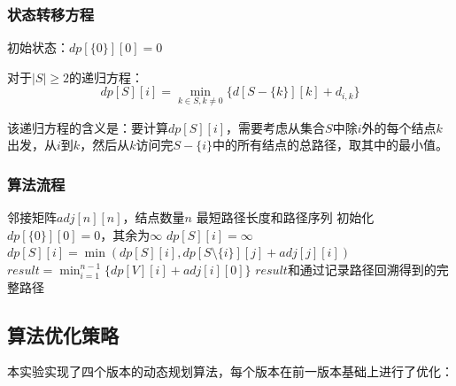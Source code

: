 \documentclass[UTF8,12pt,a4paper]{ctexart}
\begin{document}
\subsubsection{状态转移方程}

初始状态：$dp[\{0\}][0] = 0$

对于$|S| \geq 2$的递归方程：
\begin{equation}
	dp[S][i] = \min_{k \in S, k \neq 0}\{d[S-\{k\}][k] + d_{i,k}\} 
\end{equation}

该递归方程的含义是：要计算$dp[S][i]$，需要考虑从集合$S$中除$i$外的每个结点$k$出发，从$i$到$k$，然后从$k$访问完$S-\{i\}$中的所有结点的总路径，取其中的最小值。

\subsubsection{算法流程}

\begin{algorithm}[H]
    \caption{动态规划求解TSP}
    \begin{algorithmic}[1]
        \Require 邻接矩阵$adj[n][n]$，结点数量$n$
        \Ensure 最短路径长度和路径序列
        \State 初始化$dp[\{0\}][0] = 0$，其余为$\infty$
         
        \State $dp[S][i] = \infty$
         
        \State $dp[S][i] = \min(dp[S][i], dp[S \setminus \{i\}][j] + adj[j][i])$
        \EndFor
        \EndFor
        \EndFor
        \EndFor
        \State $result = \min_{i=1}^{n-1}\{dp[V][i] + adj[i][0]\}$ 
        \State \Return $result$和通过记录路径回溯得到的完整路径
    \end{algorithmic}
\end{algorithm}
\subsection{算法优化策略}

本实验实现了四个版本的动态规划算法，每个版本在前一版本基础上进行了优化：
\end{document}
